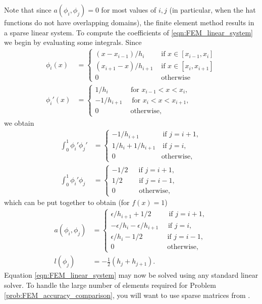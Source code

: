 Note that since $a(\phi_i,\phi_j) = 0$ for most values of $i, j$ (in particular, when the hat functions do not have overlapping domains), the finite element method results in a sparse linear system.
To compute the coefficients of \eqref{eqn:FEM_linear_system} we begin by evaluating some integrals.
Since
\begin{align*}
\phi_i(x) &= \begin{cases}
(x - x_{i-1})/h_i &\text{ if } x \in [x_{i-1},x_i]\\
 (x_{i+1} - x)/h_{i+1}  &\text{ if } x \in [x_{i},x_{i+1}]\\
0 &\text{ otherwise}
\end{cases}
\\
\phi_i'(x) &= \begin{cases}
1/h_i \quad \quad \quad \, \text{for } x_{i-1} < x < x_i,\\
 -1/h_{i+1} \quad \text{ for } x_{i} < x < x_{i+1},\\
0 \quad \quad \quad \quad \, \text{ otherwise},
\end{cases}
\end{align*}
we obtain
\begin{align*}
\int_0^1  \phi_i'\phi_j' &= \begin{cases}
- 1/h_{i+1} \quad \quad \quad \text{ if } j=i+1,\\
1/h_i + 1/h_{i+1} \quad \text{if } j=i,\\
0 \quad \quad \quad \quad \quad \quad \, \text{ otherwise},
\end{cases} \\
\int_0^1  \phi_i'\phi_j &= \begin{cases}
- 1/2 \quad \,\text{ if } j=i+1,\\
1/2 \quad \quad \text{ if } j=i-1,\\
0 \quad \quad \quad \text{ otherwise},
\end{cases}
\end{align*}
which can be put together to obtain (for \(f(x)=1\))
\begin{align*}
a(\phi_i,\phi_j) &= \begin{cases}
\epsilon/h_{i+1} + 1/2 \quad \quad \, \text{ if } j=i+1,\\
-\epsilon/h_i -\epsilon/h_{i+1} \quad  \text{ if } j=i,\\
\epsilon/h_i - 1/2 \quad \quad \quad \, \text{ if } j=i-1,\\
0 \quad \quad \quad \quad \quad \quad \,\,\,\,\,\,\, \text{ otherwise},
\end{cases}\\
l(\phi_j) &= -\frac{1}{2}(h_j + h_{j+1}).
\end{align*}
Equation \eqref{eqn:FEM_linear_system} may now be solved using any standard linear solver. 
To handle the large number of elements required for Problem \ref{prob:FEM_accuracy_comparison}, you will want to use sparse matrices from .


